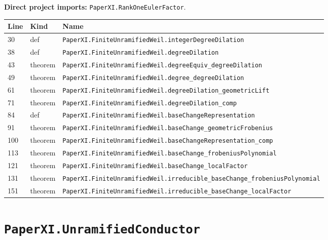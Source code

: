 \documentclass[10pt,oneside]{book}
\begin{document}
\textbf{Direct project imports:} \nolinkurl{PaperXI.RankOneEulerFactor}.

\begin{longtable}{@{}p{}p{}p{}@{}}\toprule Line&Kind&Name\\\midrule\endhead

30&def&\nolinkurl{PaperXI.FiniteUnramifiedWeil.integerDegreeDilation}\\

38&def&\nolinkurl{PaperXI.FiniteUnramifiedWeil.degreeDilation}\\

43&theorem&\nolinkurl{PaperXI.FiniteUnramifiedWeil.degreeEquiv_degreeDilation}\\

49&theorem&\nolinkurl{PaperXI.FiniteUnramifiedWeil.degree_degreeDilation}\\

61&theorem&\nolinkurl{PaperXI.FiniteUnramifiedWeil.degreeDilation_geometricLift}\\

71&theorem&\nolinkurl{PaperXI.FiniteUnramifiedWeil.degreeDilation_comp}\\

84&def&\nolinkurl{PaperXI.FiniteUnramifiedWeil.baseChangeRepresentation}\\

91&theorem&\nolinkurl{PaperXI.FiniteUnramifiedWeil.baseChange_geometricFrobenius}\\

100&theorem&\nolinkurl{PaperXI.FiniteUnramifiedWeil.baseChangeRepresentation_comp}\\

113&theorem&\nolinkurl{PaperXI.FiniteUnramifiedWeil.baseChange_frobeniusPolynomial}\\

121&theorem&\nolinkurl{PaperXI.FiniteUnramifiedWeil.baseChange_localFactor}\\

131&theorem&\nolinkurl{PaperXI.FiniteUnramifiedWeil.irreducible_baseChange_frobeniusPolynomial}\\

151&theorem&\nolinkurl{PaperXI.FiniteUnramifiedWeil.irreducible_baseChange_localFactor}\\

\bottomrule\end{longtable}

\section{\texorpdfstring{\nolinkurl{PaperXI.UnramifiedConductor}}{PaperXI.UnramifiedConductor}}\label{module:PaperXI.UnramifiedConductor}
\end{document}
